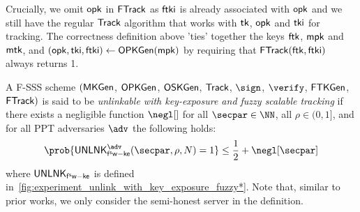 Crucially, we omit $\mathsf{opk}$ in $\mathsf{FTrack}$ as $\mathsf{ftki}$ is already associated with $\mathsf{opk}$ and we still have the regular $\mathsf{Track}$ algorithm that works with $\mathsf{tk}$, $\mathsf{opk}$ and $\mathsf{tki}$ for tracking. The correctness definition above 'ties' together the keys $\mathsf{ftk}$, $\mathsf{mpk}$ and $\mathsf{mtk}$, and $(\mathsf{opk}, \mathsf{tki}, \mathsf{ftki}) \gets \mathsf{OPKGen}(\mathsf{mpk})$ by requiring that $\mathsf{FTrack}(\mathsf{ftk}, \mathsf{ftki})$ always returns 1.



\begin{definition}
\label{def:unlink-with-key-fuzzy*}
A F-SSS scheme $(\mathsf{MKGen}$, $\mathsf{OPKGen}$, $\mathsf{OSKGen}$, $\mathsf{Track}$, $\sign$, $\verify$, $\mathsf{FTKGen}$, $\mathsf{FTrack})$ is said to be \emph{unlinkable with key-exposure and fuzzy scalable tracking} if there exists a negligible function $\negl[]$ for all $\secpar \in \NN$, all $\rho \in (0,1]$, and for all PPT adversaries $\adv$ the following holds:
\[ \prob{\unlinkfswke^\adv(\secpar, \rho,N)=1} \le \frac{1}{2} + \negl[\secpar]\]
where $\mathsf{UNLNK}_\mathsf{f^sw-ke}$ is defined in~\cref{fig:experiment_unlink_with_key_exposure_fuzzy*}. Note that, similar to prior works, we only consider the semi-honest server in the definition. 
\end{definition}
